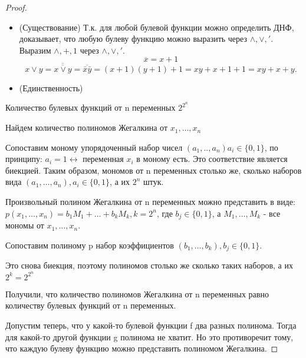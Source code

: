 \documentclass[a4paper]{article}
\theoremstyle{definition}
\theoremstyle{remark}
\begin{document}
	\begin{proof}
        \begin{itemize}
            \item (Существование) Т.к. для любой булевой функции можно определить ДНФ, доказывает, что любую булеву функцию можно выразить через $\wedge, \vee, '$. Выразим  $\wedge, +, 1$ через
            $\wedge, \vee, '$. $$\overline{x} = x + 1$$ $$x \vee y = \overline{\overline{x \vee y}} = \overline{\bar{x}\bar{y}} = (x+1)(y+1) + 1 = xy + x + 1 + 1 = xy + x + y.$$
            \item (Единственность)
        \end{itemize}Количество булевых функций от n переменных $2^{2^n}$
		
		Найдем количество полиномов Жегалкина от $x_1, \dots , x_n$
		
		Сопоставим моному упорядоченный набор чисел $(a_1, .., a_n) a_i \in \{0, 1\}$, по принципу: $a_i = 1 \leftrightarrow$ переменная $x_i$ в моному есть. Это соответствие является биекцией. Таким образом, мономов от n переменных столько же, сколько наборов вида $(a_1, \dots , a_n), a_i \in \{0, 1\}$, а их $2^n$ штук.
		
		Произвольный полином Жегалкина от n переменных можно представить в виде: $p(x_1, \dots , x_n) = b_1M_1 + \dots  + b_kM_k, k = 2^n$, где $b_j \in \{0, 1\}$, а $M_1, \dots , M_k$ - все мономы от $x_1, \dots , x_n$.
		
		Сопоставим полиному p набор коэффициентов $(b_1, \dots , b_k), b_j \in \{0, 1\}.$
		
		Это снова биекция, поэтому полиномов столько же сколько таких наборов, а их $2^k = 2^{2^n}$
		
		Получили, что количество полиномов Жегалкина от n переменных равно количеству булевых функций от n переменных.
		
		Допустим теперь, что у какой-то булевой функции f два разных полинома. Тогда для какой-то другой функции g полинома не хватит. Но это противоречит тому, что каждую булеву функцию можно представить полиномом Жегалкина.
	\end{proof}
\end{document}
